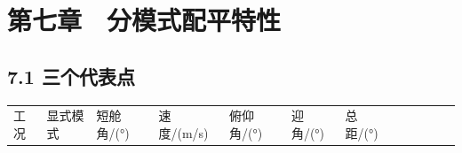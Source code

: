 \documentclass[UTF8,11pt,oneside,openany,fontset=windows]{ctexbook}
\begin{document}
\chapter{第七章　分模式配平特性}\label{ux7b2cux4e03ux7ae0-ux5206ux6a21ux5f0fux914dux5e73ux7279ux6027}

\section{7.1 三个代表点}\label{ux4e09ux4e2aux4ee3ux8868ux70b9}

\begin{longtable}[]{@{}
  >{\raggedright\arraybackslash}p{}
  >{\raggedright\arraybackslash}p{}
  >{\raggedright\arraybackslash}p{}
  >{\raggedright\arraybackslash}p{}
  >{\raggedright\arraybackslash}p{}
  >{\raggedright\arraybackslash}p{}
  >{\raggedright\arraybackslash}p{}
  >{\raggedright\arraybackslash}p{}
  >{\raggedright\arraybackslash}p{}
  >{\raggedright\arraybackslash}p{}
  >{\raggedright\arraybackslash}p{}
  >{\raggedright\arraybackslash}p{}@{}}
\toprule\noalign{}
\begin{minipage}[b]{\linewidth}\raggedright
工况
\end{minipage} & \begin{minipage}[b]{\linewidth}\raggedright
显式模式
\end{minipage} & \begin{minipage}[b]{\linewidth}\raggedright
短舱角/(°)
\end{minipage} & \begin{minipage}[b]{\linewidth}\raggedright
速度/(m/s)
\end{minipage} & \begin{minipage}[b]{\linewidth}\raggedright
俯仰角/(°)
\end{minipage} & \begin{minipage}[b]{\linewidth}\raggedright
迎角/(°)
\end{minipage} & \begin{minipage}[b]{\linewidth}\raggedright
总距/(°)
\end{minipage} & \begin{minipage}[b]{\linewidth}\raggedright

\end{minipage}
\end{longtable}
\end{document}
